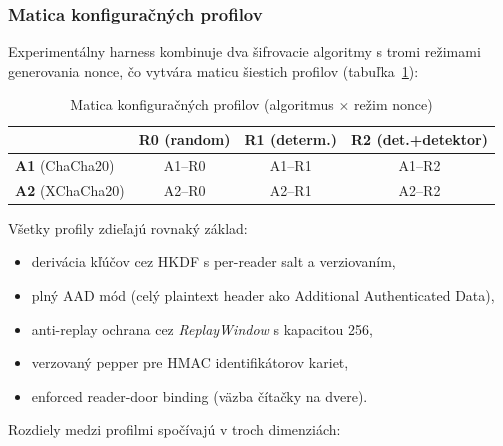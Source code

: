 \subsubsection{Matica konfiguračných profilov}
\label{sec:profile_matrix}

Experimentálny harness kombinuje dva šifrovacie algoritmy s tromi režimami generovania nonce, čo vytvára maticu šiestich profilov (tabuľka~\ref{tab:profile_matrix}):

\begin{table}[H]
\renewcommand{\arraystretch}{1.3}
\centering
\caption{Matica konfiguračných profilov (algoritmus $\times$ režim nonce)}
\label{tab:profile_matrix}
\footnotesize
\begin{tabular}{l c c c}
\toprule
& \textbf{R0} (random) & \textbf{R1} (determ.) & \textbf{R2} (det.+detektor) \\
\midrule
\textbf{A1} (ChaCha20) & A1--R0 & A1--R1 & A1--R2 \\
\textbf{A2} (XChaCha20) & A2--R0 & A2--R1 & A2--R2 \\
\bottomrule
\end{tabular}
\normalsize
\end{table}

\noindent Všetky profily zdieľajú rovnaký základ:

\begin{itemize}[leftmargin=*,itemsep=2pt]
  \item derivácia kľúčov cez HKDF s per-reader salt a verziovaním,
  \item plný AAD mód (celý plaintext header ako Additional Authenticated Data),
  \item anti-replay ochrana cez \emph{ReplayWindow} s kapacitou 256,
  \item verzovaný pepper pre HMAC identifikátorov kariet,
  \item enforced reader-door binding (väzba čítačky na dvere).
\end{itemize}

\noindent Rozdiely medzi profilmi spočívajú v troch dimenziách:


